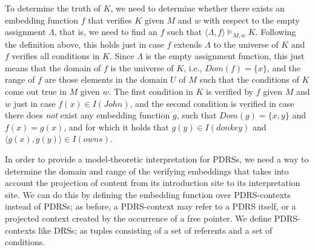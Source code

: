To determine the truth of $K$, we need to determine whether there exists an
embedding function $f$ that verifies $K$ given $M$ and $w$ with respect to
the empty assignment $\Lambda$, that is, we need to find an $f$ such that
$\langle \Lambda, f\rangle \vDash_{M,w} K$. Following the definition above,
this holds just in case $f$ extends $\Lambda$ to the universe of $K$ and $f$
verifies all conditions in $K$. Since $\Lambda$ is the empty assignment
function, this just means that the domain of $f$ is the universe of $K$,
i.e., $Dom(f)=\{x\}$, and the range of $f$ are those elements in the domain
$U$ of $M$ such that the conditions of $K$ come out true in $M$ given $w$.
The first condition in $K$ is verified by $f$ given $M$ and $w$ just in case
$f(x) \in I(John)$, and the second condition is verified in case there does
\textit{not} exist any embedding function $g$, such that $Dom(g)=\{x,y\}$
and $f(x)=g(x)$, and for which it holds that $g(y)\in I(donkey)$ and
$\langle g(x), g(y)\rangle\in I(owns)$.

In order to provide a model-theoretic interpretation for PDRSs, we need
a way to determine the domain and range of the verifying embeddings that
takes into account the projection of content from its introduction site to
its interpretation site. We can do this by defining the embedding function
over PDRS-contexts instead of PDRSs; as before, a PDRS-context may refer to a PDRS
itself, or a projected context created by the occurrence of a free pointer.
We define PDRS-contexts like DRSs; as tuples consisting of a set of referents and a set of conditions. 





